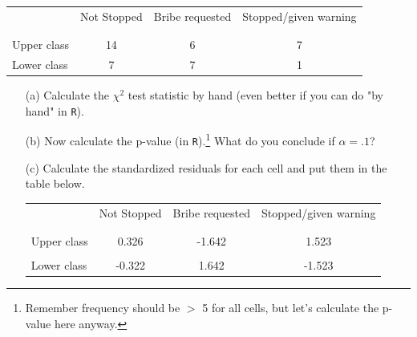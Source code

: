 \documentclass[12pt,letterpaper]{article}
\begin{document}
\newpage
\begin{table}[h!]
	\centering
	\begin{tabular}{l | c c c }
		& Not Stopped & Bribe requested & Stopped/given warning \\
		\\[-1.8ex] 
		\hline \\[-1.8ex]
		Upper class & 14 & 6 & 7 \\
		Lower class & 7 & 7 & 1 \\
		\hline
	\end{tabular}
\end{table}

\begin{enumerate}
	
	\item [(a)]
	Calculate the $\chi^2$ test statistic by hand (even better if you can do "by hand" in \texttt{R}).\\
	
	\item [(b)]
	\vspace{1cm}
	Now calculate the p-value (in \texttt{R}).\footnote{Remember frequency should be $>$ 5 for all cells, but let's calculate the p-value here anyway.}  What do you conclude if $\alpha = .1$?\\
	
	\newpage
	\item [(c)] Calculate the standardized residuals for each cell and put them in the table below.
	\vspace{1cm}
	
	\begin{table}[h]
		\centering
		\begin{tabular}{l | c c c }
			& Not Stopped & Bribe requested & Stopped/given warning \\
			\\[-1.8ex] 
			\hline \\[-1.8ex]
			Upper class  & 0.326 & -1.642 & 1.523 \\
			\\
			Lower class & -0.322 & 1.642  & -1.523  \\
		\end{tabular}
	\end{table}
	
	
	

\end{enumerate}
\end{document}
